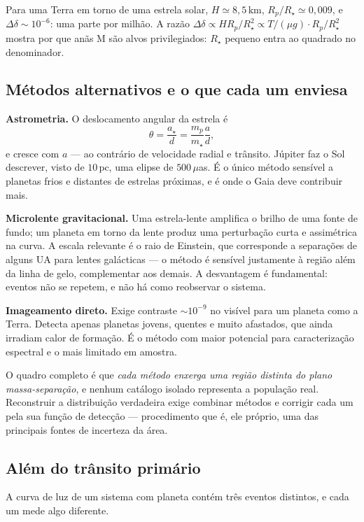 \documentclass[11pt,a4paper]{article}
\begin{document}
Para uma Terra em torno de uma estrela solar, $H\simeq8{,}5\,\mathrm{km}$, $R_p/R_\star\simeq0{,}009$, e $\Delta\delta\sim10^{-6}$: uma parte por milhão. A razão $\Delta\delta\propto H R_p/R_\star^{2}\propto T/(\mu g)\cdot R_p/R_\star^{2}$ mostra por que anãs M são alvos privilegiados: $R_\star$ pequeno entra ao quadrado no denominador.

\subsection*{Métodos alternativos e o que cada um enviesa}

\textbf{Astrometria.} O deslocamento angular da estrela é
\[
\theta=\frac{a_\star}{d}=\frac{m_p}{m_\star}\frac{a}{d},
\]
e cresce com $a$ --- ao contrário de velocidade radial e trânsito. Júpiter faz o Sol descrever, visto de $10\,\mathrm{pc}$, uma elipse de $500\,\mu$as. É o único método sensível a planetas frios e distantes de estrelas próximas, e é onde o Gaia deve contribuir mais.

\textbf{Microlente gravitacional.} Uma estrela-lente amplifica o brilho de uma fonte de fundo; um planeta em torno da lente produz uma perturbação curta e assimétrica na curva. A escala relevante é o raio de Einstein, que corresponde a separações de alguns UA para lentes galácticas --- o método é sensível justamente à região além da linha de gelo, complementar aos demais. A desvantagem é fundamental: eventos não se repetem, e não há como reobservar o sistema.

\textbf{Imageamento direto.} Exige contraste $\sim10^{-9}$ no visível para um planeta como a Terra. Detecta apenas planetas jovens, quentes e muito afastados, que ainda irradiam calor de formação. É o método com maior potencial para caracterização espectral e o mais limitado em amostra.

O quadro completo é que \emph{cada método enxerga uma região distinta do plano massa-separação}, e nenhum catálogo isolado representa a população real. Reconstruir a distribuição verdadeira exige combinar métodos e corrigir cada um pela sua função de detecção --- procedimento que é, ele próprio, uma das principais fontes de incerteza da área.

\subsection*{Além do trânsito primário}

A curva de luz de um sistema com planeta contém três eventos distintos, e cada um mede algo diferente.
\end{document}
